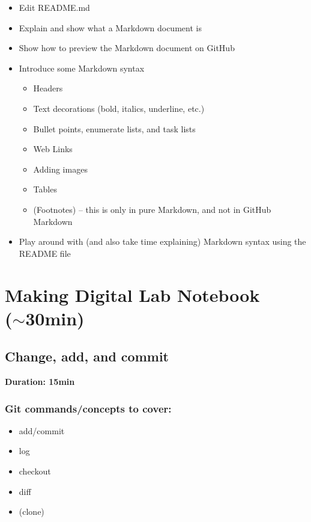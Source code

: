 \documentclass[a4paper, 12pt, oneside]{report} %
\begin{document}
\begin{itemize}
	\item Edit README.md
	\item Explain and show what a Markdown document is
	\item Show how to preview the Markdown document on GitHub
	\item Introduce some Markdown syntax
		\begin{itemize}
			\item Headers
			\item Text decorations (bold, italics, underline, etc.)
			\item Bullet points, enumerate lists, and task lists
			\item Web Links
			\item Adding images
			\item Tables
			\item (Footnotes) -- this is only in pure Markdown, and not in GitHub Markdown
		\end{itemize}
	\item Play around with (and also take time explaining) Markdown syntax using the README file
\end{itemize}


\chapter{Making Digital Lab Notebook\\($\sim$30min)}
\label{cha:making_digital_lab_notebook}

\section{Change, add, and commit}
\label{sec:change_add_and_commit}

{\bfseries Duration: 15min}

\singlespacing
\subsection*{Git commands/concepts to cover:}

\begin{itemize}
	\item add/commit
	\item log
	\item checkout
	\item diff
	\item (clone)
\end{itemize}
\end{document}
